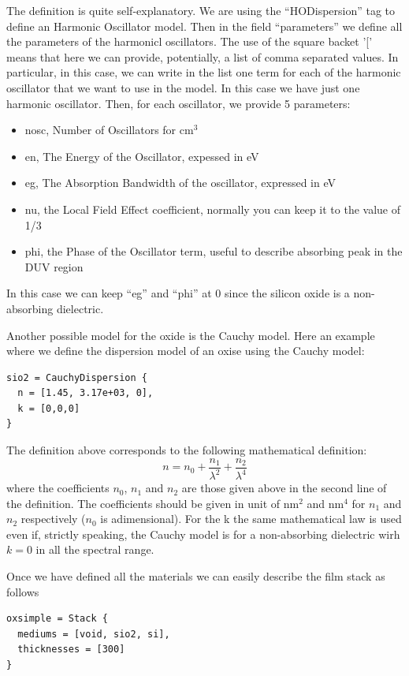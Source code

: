 \documentclass[a4paper]{report}
\begin{document}
The definition is quite self-explanatory. We are using the
``HODispersion'' tag to define an Harmonic Oscillator model. Then in
the field ``parameters'' we define all the parameters of the harmonicl
oscillators. The use of the square backet '[' means that here we can
provide, potentially, a list of comma separated values. In particular,
in this case, we can write in the list one term for each of the
harmonic oscillator that we want to use in the model. In this case we
have just one harmonic oscillator. Then, for each oscillator, we
provide 5 parameters:
\begin{itemize}
  \item nosc, Number of Oscillators for $\textrm{cm}^3$
  \item en, The Energy of the Oscillator, expessed in eV
  \item eg, The Absorption Bandwidth of the oscillator, expressed in
  eV
  \item nu, the Local Field Effect coefficient, normally you can keep
  it to the value of 1/3
  \item phi, the Phase of the Oscillator term, useful to describe
  absorbing peak in the DUV region
\end{itemize}
In this case we can keep ``eg'' and ``phi'' at 0 since the silicon
oxide is a non-absorbing dielectric.

Another possible model for the oxide is the Cauchy model.
Here an example where we define the dispersion model of an oxise using the Cauchy model:
\begin{verbatim}
sio2 = CauchyDispersion { 
  n = [1.45, 3.17e+03, 0], 
  k = [0,0,0]
}
\end{verbatim}
The definition above corresponds to the following mathematical definition:
\begin{equation}
  n = n_0 + \frac{n_1}{\lambda^2} + \frac{n_2}{\lambda^4}
\end{equation}
where the coefficients $n_0$, $n_1$ and $n_2$ are those given above in the second line of the definition.
The coefficients should be given in unit of $\textrm{nm}^2$ and $\textrm{nm}^4$ for $n_1$ and $n_2$ respectively ($n_0$ is adimensional).
For the k the same mathematical law is used even if, strictly speaking, the Cauchy model is for a non-absorbing dielectric wirh $k = 0$ in all the spectral range.

Once we have defined all the materials we can easily describe the film
stack as follows
\begin{verbatim}
oxsimple = Stack {
  mediums = [void, sio2, si],
  thicknesses = [300]
}
\end{verbatim}
\end{document}

